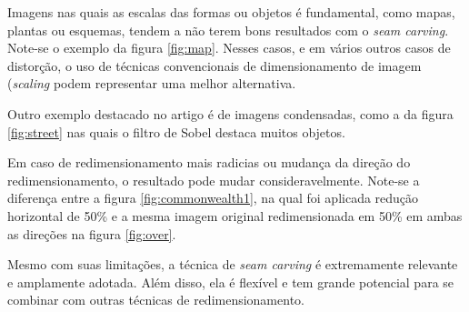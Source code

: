 Imagens nas quais as escalas das formas ou objetos é fundamental,
como mapas, plantas ou esquemas,
tendem a não terem bons resultados com o {\it seam carving}.
Note-se o exemplo da figura \ref{fig:map}.
Nesses casos, 
e em vários outros casos de distorção,
o uso de técnicas convencionais de dimensionamento de imagem ({\it scaling}
podem representar uma melhor alternativa.


Outro exemplo destacado no artigo \cite{shai2007seam} é
de imagens condensadas, como a da figura \ref{fig:street}
nas quais o filtro de Sobel destaca muitos objetos.


Em caso de redimensionamento mais radicias ou
mudança da direção do redimensionamento,
o resultado pode mudar consideravelmente.
Note-se a diferença entre a figura \ref{fig:commonwealth1},
na qual foi aplicada redução horizontal de 50\% e 
a mesma imagem original redimensionada em 50\% em ambas as direções na 
figura \ref{fig:over}.



Mesmo com suas limitações, 
a técnica de {\it seam carving} é extremamente relevante e amplamente adotada.
Além disso, 
ela é flexível e tem grande potencial para se combinar 
com outras técnicas de redimensionamento.
